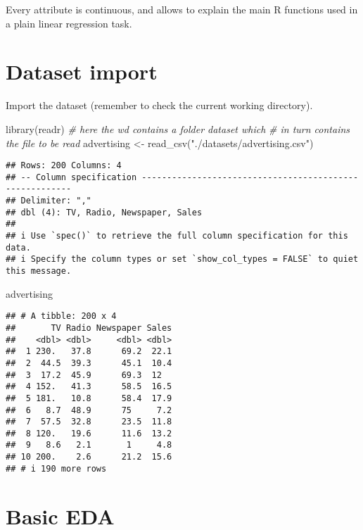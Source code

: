 \documentclass[
  oneside]{book}
\newenvironment{Shaded}{\begin{snugshade}}{\end{snugshade}}
\newcommand{\CommentTok}[1]{\textcolor[rgb]{0.56,0.35,0.01}{\textit{#1}}}
\newcommand{\FunctionTok}[1]{\textcolor[rgb]{0.00,0.00,0.00}{#1}}
\newcommand{\NormalTok}[1]{#1}
\newcommand{\OtherTok}[1]{\textcolor[rgb]{0.56,0.35,0.01}{#1}}
\newcommand{\StringTok}[1]{\textcolor[rgb]{0.31,0.60,0.02}{#1}}
\begin{document}
Every attribute is continuous, and allows to explain the main R
functions used in a plain linear regression task.

\hypertarget{dataset-import}{%
\section{Dataset import}\label{dataset-import}}

Import the dataset (remember to check the current working
directory).

\begin{Shaded}
\begin{Highlighting}[]
\FunctionTok{library}\NormalTok{(readr)}
\CommentTok{\# here the wd contains a folder \textquotesingle{}dataset\textquotesingle{} which}
\CommentTok{\# in turn contains the file to be read}
\NormalTok{advertising }\OtherTok{\textless{}{-}} \FunctionTok{read\_csv}\NormalTok{(}\StringTok{"./datasets/advertising.csv"}\NormalTok{)}
\end{Highlighting}
\end{Shaded}

\begin{verbatim}
## Rows: 200 Columns: 4
## -- Column specification --------------------------------------------------------
## Delimiter: ","
## dbl (4): TV, Radio, Newspaper, Sales
## 
## i Use `spec()` to retrieve the full column specification for this data.
## i Specify the column types or set `show_col_types = FALSE` to quiet this message.
\end{verbatim}

\begin{Shaded}
\begin{Highlighting}[]
\NormalTok{advertising}
\end{Highlighting}
\end{Shaded}

\begin{verbatim}
## # A tibble: 200 x 4
##       TV Radio Newspaper Sales
##    <dbl> <dbl>     <dbl> <dbl>
##  1 230.   37.8      69.2  22.1
##  2  44.5  39.3      45.1  10.4
##  3  17.2  45.9      69.3  12  
##  4 152.   41.3      58.5  16.5
##  5 181.   10.8      58.4  17.9
##  6   8.7  48.9      75     7.2
##  7  57.5  32.8      23.5  11.8
##  8 120.   19.6      11.6  13.2
##  9   8.6   2.1       1     4.8
## 10 200.    2.6      21.2  15.6
## # i 190 more rows
\end{verbatim}

\hypertarget{basic-eda}{%
\section{Basic EDA}\label{basic-eda}}
\end{document}
